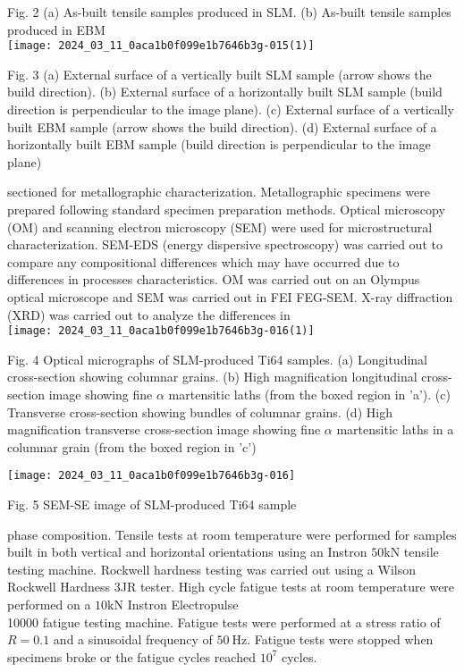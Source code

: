 \documentclass[10pt]{article}
\begin{document}
Fig. 2 (a) As-built tensile samples produced in SLM. (b) As-built tensile samples produced in EBM\\
\texttt{[image: 2024\_03\_11\_0aca1b0f099e1b7646b3g-015(1)]}

Fig. 3 (a) External surface of a vertically built SLM sample (arrow shows the build direction). (b) External surface of a horizontally built SLM sample (build direction is perpendicular to the image plane). (c) External surface of a vertically built EBM sample (arrow shows the build direction). (d) External surface of a horizontally built EBM sample (build direction is perpendicular to the image plane)

sectioned for metallographic characterization. Metallographic specimens were prepared following standard specimen preparation methods. Optical microscopy (OM) and scanning electron microscopy (SEM) were used for microstructural characterization. SEM-EDS (energy dispersive spectroscopy) was carried out to compare any compositional differences which may have occurred due to differences in processes characteristics. OM was carried out on an Olympus optical microscope and SEM was carried out in FEI FEG-SEM. X-ray diffraction (XRD) was carried out to analyze the differences in\\
\texttt{[image: 2024\_03\_11\_0aca1b0f099e1b7646b3g-016(1)]}

Fig. 4 Optical micrographs of SLM-produced Ti64 samples. (a) Longitudinal cross-section showing columnar grains. (b) High magnification longitudinal cross-section image showing fine $\alpha$ martensitic laths (from the boxed region in 'a'). (c) Transverse cross-section showing bundles of columnar grains. (d) High magnification transverse cross-section image showing fine $\alpha$ martensitic laths in a columnar grain (from the boxed region in 'c')

\begin{center}
\texttt{[image: 2024\_03\_11\_0aca1b0f099e1b7646b3g-016]}
\end{center}

Fig. 5 SEM-SE image of SLM-produced Ti64 sample

phase composition. Tensile tests at room temperature were performed for samples built in both vertical and horizontal orientations using an Instron $50 \mathrm{kN}$ tensile testing machine. Rockwell hardness testing was carried out using a Wilson Rockwell Hardness 3JR tester. High cycle fatigue tests at room temperature were performed on a $10 \mathrm{kN}$ Instron Electropulse\\
10000 fatigue testing machine. Fatigue tests were performed at a stress ratio of $R=0.1$ and a sinusoidal frequency of $50 \mathrm{~Hz}$. Fatigue tests were stopped when specimens broke or the fatigue cycles reached $10^{7}$ cycles.
\end{document}
